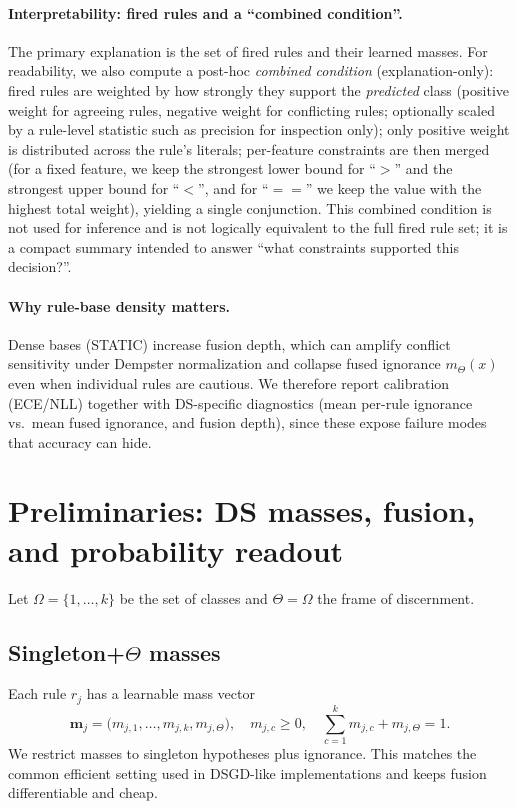 \documentclass[11pt,a4paper]{article}
\providecommand{\mb}[1]{#1}
\renewcommand{\mb}[1]{\bm{#1}}
\providecommand{\1}{}
\renewcommand{\1}{\mathbbm{1}}
\begin{document}
\paragraph{Interpretability: fired rules and a ``combined condition''.}
The primary explanation is the set of fired rules and their learned masses.
For readability, we also compute a post-hoc \emph{combined condition} (explanation-only): fired rules are weighted by how strongly they support the \emph{predicted} class (positive weight for agreeing rules, negative weight for conflicting rules; optionally scaled by a rule-level statistic such as precision for inspection only); only positive weight is distributed across the rule's literals; per-feature constraints are then merged (for a fixed feature, we keep the strongest lower bound for ``$>$'' and the strongest upper bound for ``$<$'', and for ``$==$'' we keep the value with the highest total weight), yielding a single conjunction.
This combined condition is not used for inference and is not logically equivalent to the full fired rule set; it is a compact summary intended to answer ``what constraints supported this decision?''.

\paragraph{Why rule-base density matters.}
Dense bases (STATIC) increase fusion depth, which can amplify conflict sensitivity under Dempster normalization and collapse fused ignorance $m_\Theta(x)$ even when individual rules are cautious.
We therefore report calibration (ECE/NLL) together with DS-specific diagnostics (mean per-rule ignorance vs.\ mean fused ignorance, and fusion depth), since these expose failure modes that accuracy can hide.

\section{Preliminaries: DS masses, fusion, and probability readout}
Let $\Omega=\{1,\dots,k\}$ be the set of classes and $\Theta=\Omega$ the frame of discernment.

\subsection{Singleton+\texorpdfstring{$\Theta$}{Theta} masses}
Each rule $r_j$ has a learnable mass vector
\[
\mb{m}_j=\big(m_{j,1},\dots,m_{j,k},m_{j,\Theta}\big),
\quad
m_{j,c}\ge 0,\quad \sum_{c=1}^k m_{j,c}+m_{j,\Theta}=1.
\]
We restrict masses to singleton hypotheses plus ignorance. This matches the common efficient setting used in DSGD-like implementations and keeps fusion differentiable and cheap.
\end{document}
